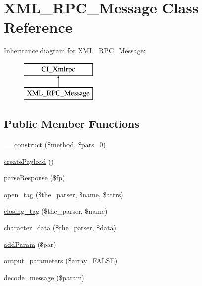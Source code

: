 \hypertarget{class_x_m_l___r_p_c___message}{\section{X\-M\-L\-\_\-\-R\-P\-C\-\_\-\-Message Class Reference}
\label{class_x_m_l___r_p_c___message}
}
Inheritance diagram for X\-M\-L\-\_\-\-R\-P\-C\-\_\-\-Message\-:\begin{figure}[H]
\begin{center}
\leavevmode
\includegraphics[height=2.000000cm]{class_x_m_l___r_p_c___message}
\end{center}
\end{figure}
\subsection*{Public Member Functions}
\begin{DoxyCompactItemize}
\item 
\hyperlink{class_x_m_l___r_p_c___message_a65e98b4724977a8f93968654edd0de15}{\-\_\-\-\_\-construct} (\$\hyperlink{class_c_i___xmlrpc_a3d7e090549ec52eba8cf65598eefa72c}{method}, \$pars=0)
\item 
\hyperlink{class_x_m_l___r_p_c___message_a9db0a53d149ebbb907ef60a27bbc9f1c}{create\-Payload} ()
\item 
\hyperlink{class_x_m_l___r_p_c___message_ab1b93386615fce804baf236bf660a646}{parse\-Response} (\$fp)
\item 
\hyperlink{class_x_m_l___r_p_c___message_a0e95fcf289aa83ab37e94456f286597a}{open\-\_\-tag} (\$the\-\_\-parser, \$name, \$attrs)
\item 
\hyperlink{class_x_m_l___r_p_c___message_a6f0fbd9812fbf30516fa22d5743d9e89}{closing\-\_\-tag} (\$the\-\_\-parser, \$name)
\item 
\hyperlink{class_x_m_l___r_p_c___message_ae10d173fc93c23cb233ff01acb2afbe2}{character\-\_\-data} (\$the\-\_\-parser, \$data)
\item 
\hyperlink{class_x_m_l___r_p_c___message_a8000e3ae75e90052e5ee10febb9ce2d0}{add\-Param} (\$par)
\item 
\hyperlink{class_x_m_l___r_p_c___message_a95187c4feff4ded37795f7b80e8d1e9a}{output\-\_\-parameters} (\$array=F\-A\-L\-S\-E)
\item 
\hyperlink{class_x_m_l___r_p_c___message_a76c958448d4b6569bfab9bfd2fb3dff0}{decode\-\_\-message} (\$param)
\end{DoxyCompactItemize}
